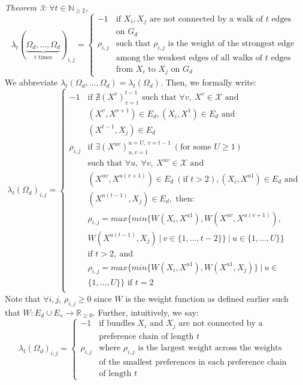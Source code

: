 \documentclass{article} %
\begin{document}
\textit{Theorem 3:} $\forall t\in \mathbb{N}_{\geq2}$,
\[
  \lambda_t(\underbrace{\Omega_d,\ldots,\Omega_d}_\text{t times})_{i,j}=
  \begin{cases}
  -1 & \textrm{if } X_i, X_j\textrm{ are not connected by a walk of }t \textrm{ edges} \\
  & \textrm{on }G_d \\
  \rho_{i,j} & \textrm{such that }\rho_{i,j}\textrm{ is the weight of the strongest edge } \\
  &\textrm{among the weakest edges of all walks of } t \textrm{ edges} \\
  & \textrm{from }X_i\textrm{ to }X_j \textrm{ on } G_d
  \end{cases}
\]
We abbreviate $\lambda_t(\Omega_d,\ldots,\Omega_d)=\lambda_t(\Omega_d)$. Then, we formally write:
\[
  \lambda_t(\Omega_d)_{i,j}=
  \begin{cases}
  -1 & \textrm{if } \nexists (X^v)_{v=1}^{t-1} \textrm{ such that } \forall v,\ X^v\in\mathcal{X}\textrm{ and } \\
  & (X^v,X^{v+1})\in E_d, (X_i,X^1)\in E_d \textrm{ and } \\
  & (X^{t-1},X_j)\in E_d\\ 
  \rho_{i,j} & \textrm{if }\exists (X^{uv})_{u,v=1}^{u=U,\ v=t-1}\ (\textrm{for some }U\geq1) \\
  & \textrm{such that }\forall u,\ \forall v,\ X^{uv}\in\mathcal{X} \textrm{ and } \\
  & (X^{uv},X^{u(v+1)})\in E_d\ (\textrm{if }t>2), (X_i, X^{u1})\in E_d \textrm{ and } \\
  & (X^{u(t-1)},X_j)\in E_d, \textrm{ then: } \\
  & \rho_{i,j}=max\Big\{min\big\{W(X_i,X^{u1}),W(X^{uv},X^{u(v+1)}), \\
  & W(X^{u(t-1)},X_j)\ |\ v\in\{1,\ldots,t-2\}\big\}\ |\ u\in\{1,\ldots,U\}\Big\} \\
  &\textrm{if } t>2,\ \textrm{and }\\
  &\rho_{i,j}=max\Big\{min\big\{W(X_i,X^{u1}), W(X^{u1},X_j)\big\}\ |\ u\in\\
  &\{1,\ldots,U\}\Big\} \textrm{ if } t=2\\
  \end{cases}
\]
Note that $\forall i,j$, $\rho_{i,j}\geq0$ since $W$ is the weight function as defined earlier such that $W:E_d \cup E_s\to\mathbb{R}_{\geq0}$. Further, intuitively, we say:
\[
  \lambda_t(\Omega_d)_{i,j}=
  \begin{cases}
  -1 & \textrm{if bundles }X_i \textrm{ and }X_j\textrm{ are not connected by a} \\
  & \textrm{preference chain of length } t\\
  \rho_{i,j} & \textrm{where }\rho_{i,j}\textrm{ is the largest weight across the weights} \\
  & \textrm{of the smallest preferences in each preference chain }\\
  & \textrm{of length }t
  \end{cases}
\]
\end{document}
